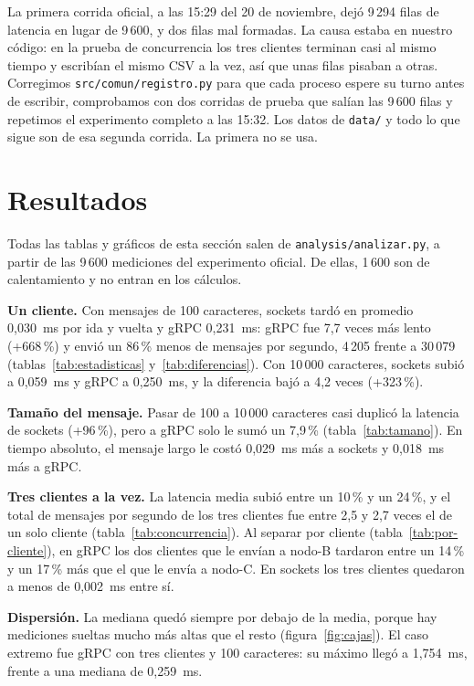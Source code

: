 \documentclass[11pt,a4paper]{article}
\begin{document}
La primera corrida oficial, a las 15:29 del 20 de noviembre, dejó 9\,294 filas de latencia en lugar de 9\,600, y dos filas mal formadas. La causa estaba en nuestro código: en la prueba de concurrencia los tres clientes terminan casi al mismo tiempo y escribían el mismo CSV a la vez, así que unas filas pisaban a otras. Corregimos \texttt{src/comun/registro.py} para que cada proceso espere su turno antes de escribir, comprobamos con dos corridas de prueba que salían las 9\,600 filas y repetimos el experimento completo a las 15:32. Los datos de \texttt{data/} y todo lo que sigue son de esa segunda corrida. La primera no se usa.

\section{Resultados}

Todas las tablas y gráficos de esta sección salen de \texttt{analysis/analizar.py}, a partir de las 9\,600 mediciones del experimento oficial. De ellas, 1\,600 son de calentamiento y no entran en los cálculos.

\textbf{Un cliente.} Con mensajes de 100 caracteres, sockets tardó en promedio 0,030~ms por ida y vuelta y gRPC 0,231~ms: gRPC fue 7,7 veces más lento (+668\,\%) y envió un 86\,\% menos de mensajes por segundo, 4\,205 frente a 30\,079 (tablas~\ref{tab:estadisticas} y~\ref{tab:diferencias}). Con 10\,000 caracteres, sockets subió a 0,059~ms y gRPC a 0,250~ms, y la diferencia bajó a 4,2 veces (+323\,\%).

\textbf{Tamaño del mensaje.} Pasar de 100 a 10\,000 caracteres casi duplicó la latencia de sockets (+96\,\%), pero a gRPC solo le sumó un 7,9\,\% (tabla~\ref{tab:tamano}). En tiempo absoluto, el mensaje largo le costó 0,029~ms más a sockets y 0,018~ms más a gRPC.

\textbf{Tres clientes a la vez.} La latencia media subió entre un 10\,\% y un 24\,\%, y el total de mensajes por segundo de los tres clientes fue entre 2,5 y 2,7 veces el de un solo cliente (tabla~\ref{tab:concurrencia}). Al separar por cliente (tabla~\ref{tab:por-cliente}), en gRPC los dos clientes que le envían a nodo-B tardaron entre un 14\,\% y un 17\,\% más que el que le envía a nodo-C. En sockets los tres clientes quedaron a menos de 0,002~ms entre sí.

\textbf{Dispersión.} La mediana quedó siempre por debajo de la media, porque hay mediciones sueltas mucho más altas que el resto (figura~\ref{fig:cajas}). El caso extremo fue gRPC con tres clientes y 100 caracteres: su máximo llegó a 1,754~ms, frente a una mediana de 0,259~ms.
\end{document}
